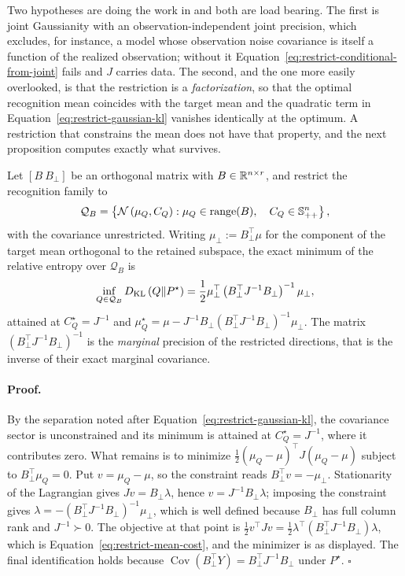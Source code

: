 Two hypotheses are doing the work in  and both are load bearing. The first is joint Gaussianity with an observation-independent joint precision, which excludes, for instance, a model whose observation noise covariance is itself a function of the realized observation; without it Equation~\eqref{eq:restrict-conditional-from-joint} fails and $J$ carries data. The second, and the one more easily overlooked, is that the restriction is a \emph{factorization}, so that the optimal recognition mean coincides with the target mean and the quadratic term in Equation~\eqref{eq:restrict-gaussian-kl} vanishes identically at the optimum. A restriction that constrains the mean does not have that property, and the next proposition computes exactly what survives.

Let $[B\ B_\perp]$ be an orthogonal matrix with $B\in\mathbb R^{n\times r}$, and restrict the recognition family to
\begin{equation}
\mathcal Q_{B}=\left\{\mathcal N\left(\mu_Q,C_Q\right):
\mu_Q\in\operatorname{range}(B),
\quad
C_Q\in\mathbb S_{++}^{n}\right\},
\label{eq:restrict-mean-family}
\end{equation}
with the covariance unrestricted. Writing $\mu_\perp:=B_\perp^\top\mu$ for the component of the target mean orthogonal to the retained subspace, the exact minimum of the relative entropy over $\mathcal Q_B$ is
\begin{equation}
\inf_{Q\in\mathcal Q_B}D_{\mathrm{KL}}\left(Q\Vert P^\star\right)
=\frac12\mu_\perp^\top\left(B_\perp^\top J^{-1}B_\perp\right)^{-1}\mu_\perp,
\label{eq:restrict-mean-cost}
\end{equation}
attained at $C_Q^\star=J^{-1}$ and $\mu_Q^\star=\mu-J^{-1}B_\perp(B_\perp^\top J^{-1}B_\perp)^{-1}\mu_\perp$. The matrix $(B_\perp^\top J^{-1}B_\perp)^{-1}$ is the \emph{marginal} precision of the restricted directions, that is the inverse of their exact marginal covariance. 

\paragraph{Proof.}
By the separation noted after Equation~\eqref{eq:restrict-gaussian-kl}, the covariance sector is unconstrained and its minimum is attained at $C_Q^\star=J^{-1}$, where it contributes zero. What remains is to minimize $\tfrac12(\mu_Q-\mu)^\top J(\mu_Q-\mu)$ subject to $B_\perp^\top\mu_Q=0$. Put $v=\mu_Q-\mu$, so the constraint reads $B_\perp^\top v=-\mu_\perp$. Stationarity of the Lagrangian gives $Jv=B_\perp\lambda$, hence $v=J^{-1}B_\perp\lambda$; imposing the constraint gives $\lambda=-(B_\perp^\top J^{-1}B_\perp)^{-1}\mu_\perp$, which is well defined because $B_\perp$ has full column rank and $J^{-1}\succ0$. The objective at that point is $\tfrac12v^\top Jv=\tfrac12\lambda^\top(B_\perp^\top J^{-1}B_\perp)\lambda$, which is Equation~\eqref{eq:restrict-mean-cost}, and the minimizer is as displayed. The final identification holds because $\operatorname{Cov}(B_\perp^\top Y)=B_\perp^\top J^{-1}B_\perp$ under $P^\star$. $\square$

